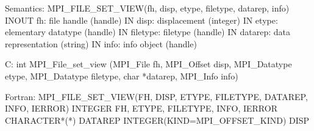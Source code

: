 Semantics:
MPI_FILE_SET_VIEW(fh, disp, etype, filetype, datarep, info)
INOUT fh: file handle (handle)
IN disp: displacement (integer)
IN etype: elementary datatype (handle)
IN filetype: filetype (handle)
IN datarep: data representation (string)
IN info: info object (handle)

C:
int MPI_File_set_view
   (MPI_File fh,
    MPI_Offset disp, MPI_Datatype etype, MPI_Datatype filetype,
    char *datarep, MPI_Info info)

Fortran:
MPI_FILE_SET_VIEW(FH, DISP, ETYPE, FILETYPE, DATAREP, INFO, IERROR)
INTEGER FH, ETYPE, FILETYPE, INFO, IERROR
CHARACTER*(*) DATAREP
INTEGER(KIND=MPI_OFFSET_KIND) DISP 
